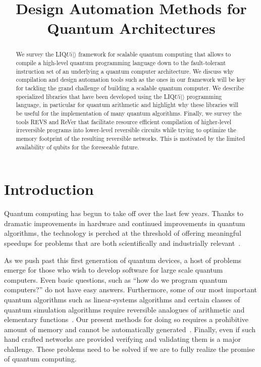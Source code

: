 \documentclass[conference]{IEEEtran}
\title{Design Automation Methods for Quantum Architectures}
\author{%
  \IEEEauthorblockN{Martin Roetteler \qquad Krysta M. Svore \qquad Nathan Wiebe}
  \IEEEauthorblockA{%
Microsoft Research, Redmond, WA, USA
  }
}
\begin{document}
\maketitle

\begin{abstract}
We survey the LIQ$Ui|\rangle$ framework for scalable quantum computing that allows to compile a high-level quantum programming language down to the fault-tolerant instruction set of an underlying a quantum computer architecture. We discuss why compilation and design automation tools such as the ones in our framework will be key for tackling the grand challenge of building a scalable quantum computer. We describe specialized libraries that have been developed using the LIQ$Ui|\rangle$ programming language, in particular for quantum arithmetic and highlight why these libraries will be useful for the implementation of many quantum algorithms. Finally, we survey the tools REVS and ReVer that facilitate resource efficient compilation of higher-level irreversible programs into lower-level reversible circuits while trying to optimize the memory footprint of the resulting reversible networks. This is motivated by the limited availability of qubits for the foreseeable future. 
\end{abstract}

\section{Introduction}
Quantum computing has begun to take off over the last few years.  Thanks to dramatic improvements in hardware and continued improvements in quantum algorithms, the technology
is perched at the threshold of offering meaningful speedups for problems that are both scientifically and industrially relevant~\cite{barends2014superconducting,cross2015quantum,o2016scalable,benedetti2016estimation}.  

As we push past this first generation of quantum devices, a host of problems emerge for those who wish to develop software for large scale quantum computers.  Even basic questions, such as ``how do we program quantum computers?'' do not have easy answers.  Furthermore, some of our most important quantum algorithms such as linear-systems algorithms and certain classes of quantum simulation algorithms require reversible analogues of arithmetic and elementary functions~\cite{harrow2009quantum,babbush2015exponentially,kivlichan2016bounding}.  Our present methods for doing so requires a prohibitive amount of memory and cannot be automatically generated~\cite{BHP+15}.  Finally, even if such hand crafted networks are provided verifying and validating them is a major challenge.  These problems need to be solved if we are to fully realize the promise of quantum computing.
\end{document}
